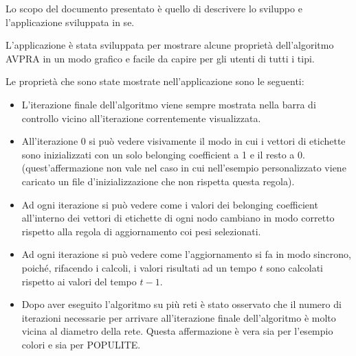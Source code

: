 \documentclass[a4paper,12pt]{report}
\begin{document}
Lo scopo del documento presentato è quello di descrivere lo sviluppo e l'applicazione sviluppata in se.

L'applicazione è stata sviluppata per mostrare alcune proprietà dell'algoritmo AVPRA in un modo grafico e facile da capire per gli utenti di tutti i tipi.

Le proprietà che sono state mostrate nell'applicazione sono le seguenti:
\begin{itemize}
\item L'iterazione finale dell'algoritmo viene sempre mostrata nella barra di controllo vicino all'iterazione correntemente visualizzata.

\item All'iterazione 0 si può vedere visivamente il modo in cui i vettori di etichette sono inizializzati con un solo belonging coefficient a 1 e il resto a 0. (quest'affermazione non vale nel caso in cui nell'esempio personalizzato viene caricato un file d'inizializzazione che non rispetta questa regola).

\item Ad ogni iterazione si può vedere come i valori dei belonging coefficient all'interno dei vettori di etichette di ogni nodo cambiano in modo corretto rispetto alla regola di aggiornamento coi pesi selezionati.

\item Ad ogni iterazione si può vedere come l'aggiornamento si fa in modo sincrono, poiché, rifacendo i calcoli, i valori risultati ad un tempo $t$ sono calcolati rispetto ai valori del tempo $t-1$.

\item Dopo aver eseguito l'algoritmo su più reti è stato osservato che il numero di iterazioni necessarie per arrivare all'iterazione finale dell'algoritmo è molto vicina al diametro della rete. Questa affermazione è vera sia per l'esempio colori e sia per POPULITE.
\end{itemize}
\end{document}
